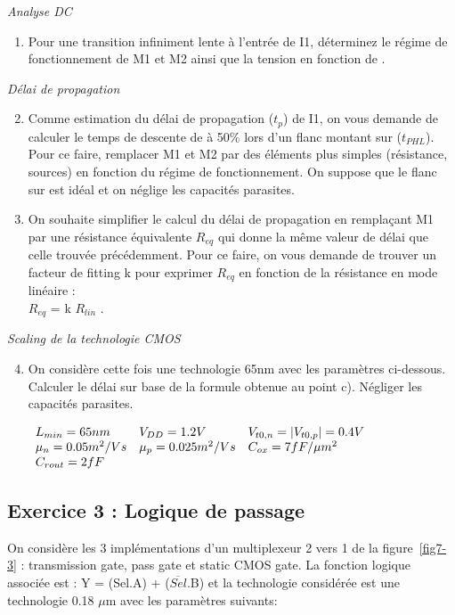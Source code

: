 \emph{Analyse DC}
\begin{enumerate}
	\item Pour une transition infiniment lente à l'entrée de I1, déterminez le régime de
	fonctionnement de M1 et M2 ainsi que la tension \vout en fonction de \vin.
\end{enumerate}

\emph{Délai de propagation}
\begin{enumerate}
	\setcounter{enumi}{1}
	\item Comme estimation du délai de propagation ($t_p$) de I1, on vous demande de
	calculer le temps de descente de \vout à 50\% lors d'un flanc montant sur \vin
	($t_{PHL}$). Pour ce faire, remplacer M1 et M2 par des éléments plus simples
	(résistance, sources) en fonction du régime de fonctionnement. On suppose que
	le flanc sur \vin est idéal et on néglige les capacités parasites.
	\item On souhaite simplifier le calcul du délai de propagation en remplaçant M1
	par une résistance équivalente $R_{eq}$ qui donne la même valeur de délai que
	celle trouvée précédemment. Pour ce faire, on vous demande de trouver un facteur
	de fitting k pour exprimer $R_{eq}$ en fonction de la résistance en mode linéaire
	:\\ $R_{eq}$ = k $R_{lin}$ .
\end{enumerate}

\emph{Scaling de la technologie CMOS}
\begin{enumerate}
	\setcounter{enumi}{3}
	\item On considère cette fois une technologie 65nm avec les paramètres ci-dessous.
	Calculer le délai sur base de la formule obtenue au point c). Négliger les capacités parasites.

	\begin{center}
	$
		\begin{array}{l l l}
			L_{min} = 65 nm 		& V_{DD} = 1.2V 		&V_{t0,n} = |V_{t0,p}| = 0.4V \\
			\mu_n = 0.05 m^2/Vs 	& \mu_p= 0.025 m^2/Vs	& C_{ox} = 7 fF/\mu m^2 \\
			C_{rout} = 2fF			&						& \\
		\end{array}
	$
	\end{center}
\end{enumerate}

\subsection*{Exercice 3 : Logique de passage}
On considère les 3 implémentations d'un multiplexeur 2 vers 1 de la figure~\ref{fig7-3} :
transmission gate, pass gate et static CMOS gate. La fonction logique associée est :
Y = (Sel.A) + ($\overline{Sel}$.B) et la technologie considérée est une technologie
0.18 $\mu$m avec les paramètres suivants:

